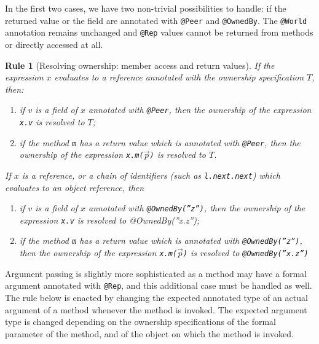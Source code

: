 \documentclass{pracamgr}
\theoremstyle{break}
\theoremstyle{break}
\theoremstyle{break}
\newtheorem{verrule}{Rule}
\begin{document}
In the first two cases, we have two non-trivial possibilities to
handle: if the returned value or the field are annotated with
\texttt{@Peer} and \texttt{@OwnedBy}. The \texttt{@World} annotation
remains unchanged and \texttt{@Rep} values cannot be returned from
methods or directly accessed at all.

\begin{verrule}[Resolving ownership: member access and return values]
  \label{vrl:res:acc}
  If the expression $x$ evaluates to a reference annotated with
  the ownership specification $T$, then:
  \begin{enumerate}[label=(\arabic*)]
  \item if $v$ is a field of $x$ annotated with \texttt{@Peer}, then
    the ownership of the expression \texttt{x.v} is resolved to $T$;
  \item \label{pnt:peer-ret} if the method \texttt{m} has a return value which is annotated
    with \texttt{@Peer}, then the ownership of the expression
    \texttt{x.m($\vec{p}$)} is resolved to $T$.
  \end{enumerate}
  If $x$ is a reference, or a chain of identifiers (such as
  \texttt{l.next.next}) which evaluates to an object reference, then
  \begin{enumerate}[label=(\arabic*), resume]
  \item if $v$ is a field of $x$ annotated with
    \texttt{@OwnedBy(''z'')}, then the ownership of the expression
    \texttt{x.v} is resolved to @OwnedBy(''x.z'');
  \item if the method \texttt{m} has a return value which is
    annotated with \texttt{@OwnedBy(''z'')}, then the ownership of
    the expression \texttt{x.m($\vec{p}$)} is resolved to
    \texttt{@OwnedBy(''x.z'')}
  \end{enumerate}
\end{verrule}

Argument passing is slightly more sophisticated as a method may have a
formal argument annotated with \texttt{@Rep}, and this additional case
must be handled as well. The rule below is enacted by changing the
expected annotated type of an actual argument of a method whenever the
method is invoked. The expected argument type is changed depending on
the ownership specifications of the formal parameter of the method,
and of the object on which the method is invoked.
\end{document}
